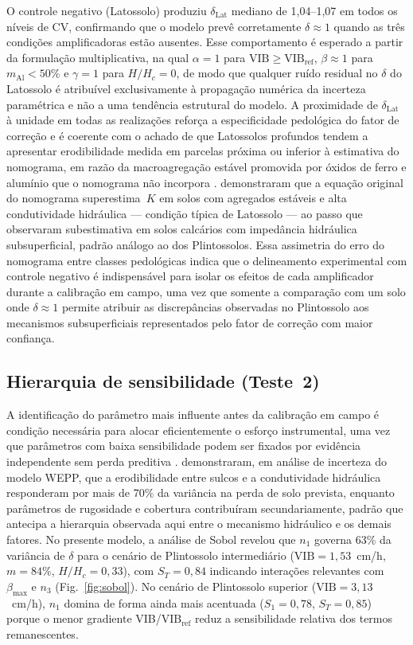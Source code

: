 \documentclass[pdflatex,sn-basic]{sn-jnl}
\begin{document}
O controle negativo (Latossolo) produziu $\delta_{\mathrm{Lat}}$ mediano de 1,04--1,07 em todos os níveis de CV, confirmando que o modelo prevê corretamente $\delta \approx 1$ quando as três condições amplificadoras estão ausentes. Esse comportamento é esperado a partir da formulação multiplicativa, na qual $\alpha = 1$ para $\mathrm{VIB} \geq \mathrm{VIB_{ref}}$, $\beta \approx 1$ para $m_{\mathrm{Al}} < 50\%$ e $\gamma = 1$ para $H/H_c = 0$, de modo que qualquer ruído residual no $\delta$ do Latossolo é atribuível exclusivamente à propagação numérica da incerteza paramétrica e não a uma tendência estrutural do modelo. A proximidade de $\delta_{\mathrm{Lat}}$ à unidade em todas as realizações reforça a especificidade pedológica do fator de correção e é coerente com o achado de que Latossolos profundos tendem a apresentar erodibilidade medida em parcelas próxima ou inferior à estimativa do nomograma, em razão da macroagregação estável promovida por óxidos de ferro e alumínio que o nomograma não incorpora \citep{cassol_et_al_2023}. \citet{auerswald_et_al_2014} demonstraram que a equação original do nomograma superestima~$K$ em solos com agregados estáveis e alta condutividade hidráulica --- condição típica de Latossolo --- ao passo que \citet{ostovari_et_al_2016} observaram subestimativa em solos calcários com impedância hidráulica subsuperficial, padrão análogo ao dos Plintossolos. Essa assimetria do erro do nomograma entre classes pedológicas indica que o delineamento experimental com controle negativo é indispensável para isolar os efeitos de cada amplificador durante a calibração em campo, uma vez que somente a comparação com um solo onde $\delta \approx 1$ permite atribuir as discrepâncias observadas no Plintossolo aos mecanismos subsuperficiais representados pelo fator de correção com maior confiança.

\subsection{Hierarquia de sensibilidade (Teste~2)}

A identificação do parâmetro mais influente antes da calibração em campo é condição necessária para alocar eficientemente o esforço instrumental, uma vez que parâmetros com baixa sensibilidade podem ser fixados por evidência independente sem perda preditiva \citep{saltelli_et_al_2004}. \citet{chaves_nearing_1991} demonstraram, em análise de incerteza do modelo WEPP, que a erodibilidade entre sulcos e a condutividade hidráulica responderam por mais de 70\% da variância na perda de solo prevista, enquanto parâmetros de rugosidade e cobertura contribuíram secundariamente, padrão que antecipa a hierarquia observada aqui entre o mecanismo hidráulico e os demais fatores. No presente modelo, a análise de Sobol revelou que $n_1$ governa 63\% da variância de $\delta$ para o cenário de Plintossolo intermediário ($\mathrm{VIB} = 1{,}53$~cm/h, $m = 84\%$, $H/H_c = 0{,}33$), com $S_T = 0{,}84$ indicando interações relevantes com $\beta_{\max}$ e $n_3$ (Fig.~\ref{fig:sobol}). No cenário de Plintossolo superior ($\mathrm{VIB} = 3{,}13$~cm/h), $n_1$ domina de forma ainda mais acentuada ($S_1 = 0{,}78$, $S_T = 0{,}85$) porque o menor gradiente VIB/$\mathrm{VIB_{ref}}$ reduz a sensibilidade relativa dos termos remanescentes.
\end{document}
